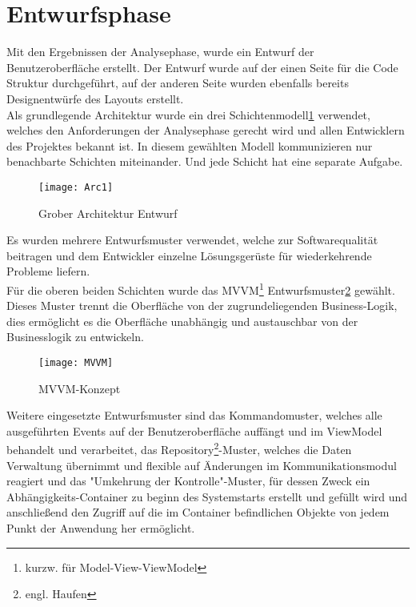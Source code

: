 \section{Entwurfsphase}
Mit den Ergebnissen der Analysephase, wurde ein Entwurf der Benutzeroberfläche erstellt. Der Entwurf wurde auf der einen Seite für die Code Struktur durchgeführt, auf der anderen Seite wurden ebenfalls bereits Designentwürfe des Layouts erstellt.\\

Als grundlegende Architektur wurde ein drei Schichtenmodell\ref{fig:arc} verwendet, welches den Anforderungen der Analysephase gerecht wird und allen Entwicklern des Projektes bekannt ist. In diesem gewählten Modell kommunizieren nur benachbarte Schichten miteinander. Und jede Schicht hat eine separate Aufgabe.

\begin{figure}[h]
	\centering
		\texttt{[image: Arc1]}
		\caption{Grober Architektur Entwurf}
		\label{fig:arc}
\end{figure}

Es wurden mehrere Entwurfsmuster verwendet, welche zur Softwarequalität beitragen und dem Entwickler einzelne Lösungsgerüste für wiederkehrende Probleme liefern.
\\
Für die oberen beiden Schichten wurde das MVVM\footnote{kurzw. für Model-View-ViewModel} Entwurfsmuster\ref{fig:mvvm} gewählt. Dieses Muster trennt die Oberfläche von der zugrundeliegenden Business-Logik, dies ermöglicht es die Oberfläche unabhängig und austauschbar von der Businesslogik zu entwickeln.\\ 

\begin{figure}[h]
	\centering
		\texttt{[image: MVVM]}
		\caption{MVVM-Konzept}
		\label{fig:mvvm}
\end{figure}

Weitere eingesetzte Entwurfsmuster sind das Kommandomuster, welches alle ausgeführten Events auf der Benutzeroberfläche auffängt und im ViewModel behandelt und verarbeitet, das Repository\footnote{engl. Haufen}-Muster, welches die Daten Verwaltung übernimmt und flexible auf Änderungen im Kommunikationsmodul reagiert und das "Umkehrung der Kontrolle"-Muster, für dessen Zweck ein Abhängigkeits-Container zu beginn des Systemstarts erstellt und gefüllt wird und anschließend den Zugriff auf die im Container befindlichen Objekte von jedem Punkt der Anwendung her ermöglicht.\\

